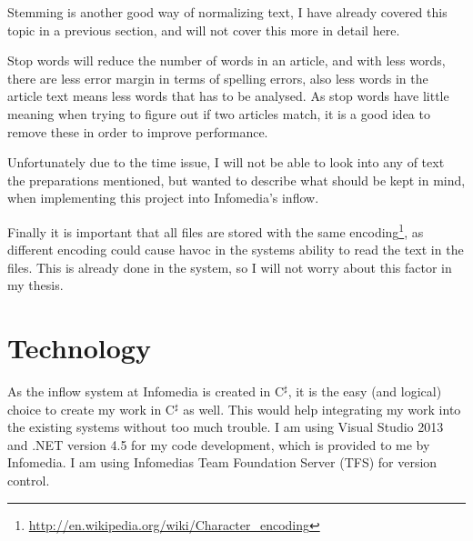 Stemming is another good way of normalizing text, I have already covered this topic in a previous section, and will not cover this more in detail here. 

Stop words will reduce the number of words in an article, and with less words, there are less error margin in terms of spelling errors, also less words in the article text means less words that has to be analysed. As stop words have little meaning when trying to figure out if two articles match, it is a good idea to remove these in order to improve performance. 

Unfortunately due to the time issue, I will not be able to look into any of text the preparations mentioned, but wanted to describe what should be kept in mind, when implementing this project into Infomedia's inflow.

Finally it is important that all files are stored with the same encoding\footnote{\url{http://en.wikipedia.org/wiki/Character_encoding}}, as different encoding could cause havoc in the systems ability to read the text in the files. This is already done in the system, so I will not worry about this factor in my thesis.

\section{Technology}
As the inflow system at Infomedia is created in C$^\sharp$, it is the easy (and logical) choice to create my work in C$^\sharp$ as well. This would help integrating my work into the existing systems without too much trouble. I am using Visual Studio 2013 and .NET version 4.5 for my code development, which is provided to me by Infomedia. I am using Infomedias Team Foundation Server (TFS) for version control. 








